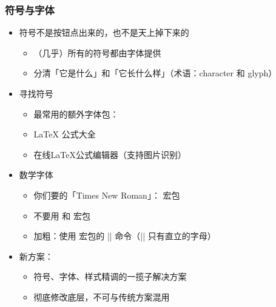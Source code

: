\begin{frame}[fragile]
\frametitle{符号与字体}
\begin{itemize}
  \item 符号不是按钮点出来的，也不是天上掉下来的 \pause

    \begin{itemize}
      \item （几乎）所有的符号都由字体提供 \pause
      \item 分清「它是什么」和「它长什么样」（术语：character 和 glyph）
    \end{itemize} \pause

  \item 寻找符号

    \begin{itemize}
      \item 最常用的额外字体包：
      \item \LaTeX{} 公式大全 
      \item 在线\LaTeX{}公式编辑器（支持图片识别） 
    \end{itemize} \pause

  \item 数学字体

    \begin{itemize}
      \item 你们要的「Times New Roman」： 宏包
      \item \alert{不要用  和  宏包}
      \item 加粗：使用  宏包的 |\bm| 命令（|\mathbf| 只有直立的字母）
    \end{itemize} \pause

  \item 新方案：

    \begin{itemize}
      \item 符号、字体、样式精调的一揽子解决方案
      \item 彻底修改底层，不可与传统方案混用
    \end{itemize}
\end{itemize}
\end{frame}

